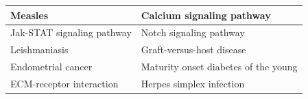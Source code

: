\documentclass[twocolumn]{article}
\begin{document}
\begin{table}[]
\begin{tabular}{|l|l|}
		Measles                                              & Calcium signaling pathway                 \\ \hline
		Jak-STAT signaling pathway                           & Notch signaling pathway                   \\ \hline
		Leishmaniasis                                        & Graft-versus-host disease                 \\ \hline
		Endometrial cancer                                   & Maturity onset diabetes of the young      \\ \hline
		ECM-receptor interaction                             & Herpes simplex infection                  \\ \hline
		
		
		
	\end{tabular}
\end{table}
\end{document}
